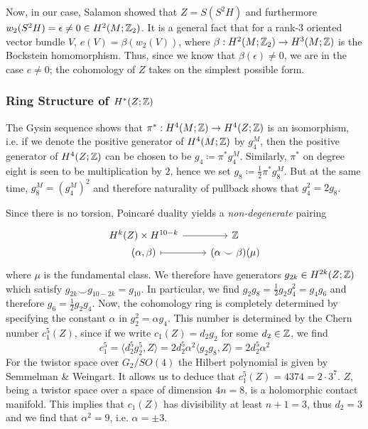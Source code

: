 \documentclass{scrartcl}
\begin{document}
Now, in our case, Salamon showed that $Z=S(S^2H)$ and furthermore $w_2(S^2H)=\epsilon\neq 0\in H^2(M;\mathbb{Z}_2)$. It is a general fact that for a rank-3 oriented vector bundle $V$, $e(V)=\beta(w_2(V))$, where $\beta:H^2(M;\mathbb{Z}_2)\to H^3(M;\mathbb{Z})$ is the Bockstein homomorphism. 
Thus, since we know that $\beta(\epsilon)\neq 0$, we are in the case $e\neq 0$; the cohomology of $Z$ takes on the simplest possible form.


\subsubsection{Ring Structure of \texorpdfstring{$H^*(Z;\mathbb{Z})$}{the Integral Cohomology of Z}}

The Gysin sequence shows that $\pi^*:H^4(M;\mathbb{Z})\to H^4(Z;\mathbb{Z})$ is an isomorphism, i.e. if we denote the positive generator of $H^4(M;\mathbb{Z})$ by $g_4^M$, then the positive generator of $H^4(Z;\mathbb{Z})$ can be chosen to be $g_4\coloneqq \pi^* g_4^M$. Similarly, $\pi^*$ on degree eight is seen to be multiplication by $2$, hence we set $g_8\coloneqq \frac{1}{2}\pi^*g_8^M$. But at the same time, $g_8^M=(g_4^M)^2$ and therefore naturality of pullback shows that $g_4^2=2g_8$. 

\medskip

Since there is no torsion, Poincar\'e duality yields a \emph{non-degenerate} pairing 
\begin{equation*}
	\begin{tikzcd}[row sep=0cm]
		H^k(Z) \times H^{10-k} \ar[r] & \Z \\
		(\alpha,\beta)\ar[r,mapsto] & (\alpha\smile\beta)(\mu)
	\end{tikzcd}
\end{equation*}
where $\mu$ is the fundamental class. We therefore have generators $g_{2k}\in H^{2k}(Z;\mathbb{Z})$ which satisfy $g_{2k}\smile g_{10-2k}=g_{10}$. In particular, we find $g_2g_8=\frac{1}{2}g_2g_4^2=g_4g_6$ and therefore $g_6=\frac{1}{2}g_2g_4$. Now, the cohomology ring is completely determined by specifying the constant $\alpha$ in $g_2^2=\alpha g_4$. This number is determined by the Chern number $c_1^5(Z)$, since if we write $c_1(Z)=d_2 g_2$ for some $d_2\in \mathbb{Z}$, we find
\begin{equation*}
	c_1^5=\langle d_2^5g_2^5,Z\rangle
	=2d_2^5\alpha^2\langle g_2g_8,Z\rangle=2d_2^5\alpha^2
\end{equation*}
For the twistor space over $G_2/SO(4)$ the Hilbert polynomial is given by Semmelman \& Weingart. It allows us to deduce that $c_1^5(Z)=4374=2\cdot 3^7$. $Z$, being a twistor space over a space of dimension $4n=8$, is a holomorphic contact manifold. This implies that $c_1(Z)$ has divisibility at least $n+1=3$, thus $d_2=3$ and we find that $\alpha^2=9$, i.e. $\alpha=\pm 3$.
\end{document}
